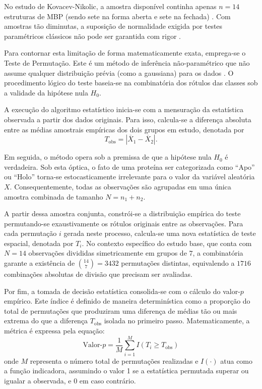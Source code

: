 \documentclass[12pt, a4paper]{article}
\theoremstyle{plain}
\theoremstyle{definition}
\theoremstyle{remark}
\newcommand{\ident}{\hspace{2em}}
\begin{document}
\ident No estudo de Kovacev-Nikolic, a amostra disponível continha apenas $n = 14$ estruturas de MBP (sendo sete na forma aberta e sete na fechada) \cite{kovacev2016}. Com amostras tão diminutas, a suposição de normalidade exigida por testes paramétricos clássicos não pode ser garantida com rigor \cite{devore2012}.

\ident Para contornar esta limitação de forma matematicamente exata, emprega-se o Teste de Permutação. Este é um método de inferência não-paramétrico que não assume qualquer distribuição prévia (como a gaussiana) para os dados \cite{devore2012}. O procedimento lógico do teste baseia-se na combinatória dos rótulos das classes sob a validade da hipótese nula $H_0$.

\ident A execução do algoritmo estatístico inicia-se com a mensuração da estatística observada a partir dos dados originais. Para isso, calcula-se a diferença absoluta entre as médias amostrais empíricas dos dois grupos em estudo, denotada por 
\begin{equation*}
    T_{\text{obs}} = |\overline{X}_1 - \overline{X}_2|.
\end{equation*} 

Em seguida, o método opera sob a premissa de que a hipótese nula $H_0$ é verdadeira. Sob esta óptica, o fato de uma proteína ser categorizada como \enquote{Apo} ou \enquote{Holo} torna-se estocasticamente irrelevante para o valor da variável aleatória $X$. Consequentemente, todas as observações são agrupadas em uma única amostra combinada de tamanho $N = n_1 + n_2$. 

\ident A partir dessa amostra conjunta, constrói-se a distribuição empírica do teste permutando-se exaustivamente os rótulos originais entre as observações. Para cada permutação $i$ gerada neste processo, calcula-se uma nova estatística de teste espacial, denotada por $T_i$. No contexto específico do estudo base, que conta com $N=14$ observações divididas simetricamente em grupos de $7$, a combinatória garante a existência de $\binom{14}{7} = 3432$ permutações distintas, equivalendo a $1716$ combinações absolutas de divisão que precisam ser avaliadas.

\ident Por fim, a tomada de decisão estatística consolida-se com o cálculo do valor-$p$ empírico. Este índice é definido de maneira determinística como a proporção do total de permutações que produziram uma diferença de médias tão ou mais extrema do que a diferença $T_{\text{obs}}$ isolada no primeiro passo. Matematicamente, a métrica é expressa pela equação:
\begin{equation}
    \text{Valor-}p = \frac{1}{M} \sum_{i=1}^{M} I(T_i \geq T_{\text{obs}})
\end{equation}
onde $M$ representa o número total de permutações realizadas e $I(\cdot)$ atua como a função indicadora, assumindo o valor 1 se a estatística permutada superar ou igualar a observada, e 0 em caso contrário.
\end{document}
